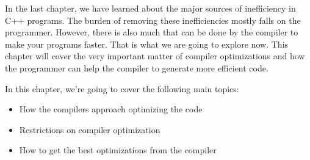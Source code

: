 In the last chapter, we have learned about the major sources of inefficiency in C++ programs. The burden of removing these inefficiencies mostly falls on the programmer. However, there is also much that can be done by the compiler to make your programs faster. That is what we are going to explore now. This chapter will cover the very important matter of compiler optimizations and how the programmer can help the compiler to generate more efficient code. 

In this chapter, we're going to cover the following main topics:

\begin{itemize}
\item
How the compilers approach optimizing the code

\item
Restrictions on compiler optimization 

\item
How to get the best optimizations from the compiler
\end{itemize}